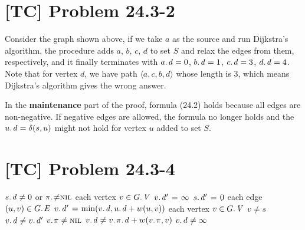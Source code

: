 \documentclass[a4paper,11pt,twocolumn]{article}
\newcommand{\NIL}{\const{nil}}
\newcommand{\FALSE}{\const{false}}
\newcommand{\TRUE}{\const{true}}
\begin{document}
  \section{[TC] Problem 24.3-2}
  \small
  \begin{center}
   \par
  \end{center}
  \normalsize
  Consider the graph shown above, if we take $a$ as the source and run Dijkstra's algorithm, the procedure adds $a$, $b$, $c$, $d$ to set $S$ and relax the edges from them, respectively, and it finally terminates with $\attrib{a}{d} = 0$, $\attrib{b}{d} = 1$, $\attrib{c}{d} = 3$, $\attrib{d}{d} = 4$. Note that for vertex $d$, we have path $\langle a, c, b, d \rangle$ whose length is 3, which means Dijkstra's algorithm gives the wrong answer. \par
  In the \textbf{maintenance} part of the proof, formula (24.2) holds because all edges are non-negative. If negative edges are allowed, the formula no longer holds and the $\attrib{u}{d} = \delta(s, u)$ might not hold for vertex $u$ added to set $S$.
  
  \section{[TC] Problem 24.3-4}
  \begin{codebox}
  \li \If $\attrib{s}{d} \neq 0$ or $\attrib{\pi} \neq \NIL$
  \li \Do \Return \FALSE
      \End
  \li \For each vertex $v \in \attrib{G}{V}$
  \li \Do  $\attrib{v}{d'} \gets \infty$
      \End
  \li $\attrib{s}{d'} \gets 0$
  \li \For each edge $(u, v) \in \attrib{G}{E}$
  \li \Do  $\attrib{v}{d'} \gets \min(\attrib{v}{d}, \attrib{u}{d} + w(u, v))$
      \End
  \li \For each vertex $v \in \attrib{G}{V}$
  \li \Do \If $v \neq s$
  \li     \Do \If $\attrib{v}{d} \neq \attrib{v}{d'}$
  \li         \Do \Return \FALSE
              \End
  \li     \If $\attrib{v}{\pi} \neq \NIL$ 
  \li         \Do \If $\attrib{v}{d} \neq \attribb{v}{\pi}{d} + w(\attrib{v}{\pi}, v)$
  \li             \Do \Return \FALSE
                  \End
  \li         \ElseIf $\attrib{v}{d} \neq \infty$
  \li         \Do \Return \FALSE
              \End
          \End
      \End
  \li \Return \TRUE
  \end{codebox}
  
\end{document}
